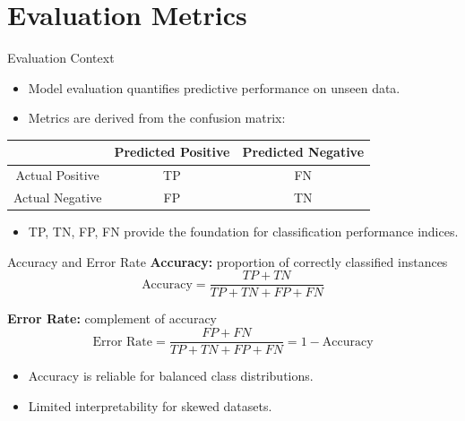 \documentclass[serif, aspectratio=169]{beamer}
\begin{document}
    \section{Evaluation Metrics}

    \begin{frame}{Evaluation Context}
        \begin{itemize}
            \item Model evaluation quantifies predictive performance on unseen data.
            \item Metrics are derived from the confusion matrix:
        \end{itemize}
        \vspace{0.3cm}
        \begin{center}
            \begin{tabular}{c|cc}
                \toprule
                & Predicted Positive & Predicted Negative \\
                \midrule
                Actual Positive & TP & FN \\
                Actual Negative & FP & TN \\
                \bottomrule
            \end{tabular}
        \end{center}
        \vspace{0.3cm}
        \begin{itemize}
            \item TP, TN, FP, FN provide the foundation for classification performance indices.
        \end{itemize}
    \end{frame}

    \begin{frame}{Accuracy and Error Rate}
        \textbf{Accuracy:} proportion of correctly classified instances
        \[
            \text{Accuracy} = \frac{TP + TN}{TP + TN + FP + FN}
        \]

        \textbf{Error Rate:} complement of accuracy
        \[
            \text{Error Rate} = \frac{FP + FN}{TP + TN + FP + FN} = 1 - \text{Accuracy}
        \]

        \vspace{0.3cm}
        \begin{itemize}
            \item Accuracy is reliable for balanced class distributions.
            \item Limited interpretability for skewed datasets.
        \end{itemize}
    \end{frame}
\end{document}
